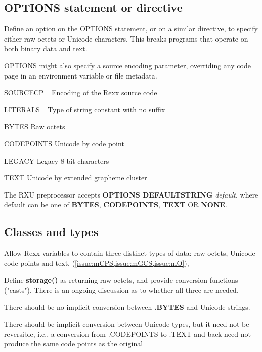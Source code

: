 \documentclass[b4paper]{article}
\begin{document}
\subsection{\textbf{OPTIONS} statement or directive}

Define an option on the OPTIONS statement, or on a similar directive,
to specify either raw octets or Unicode characters.
This breaks programs that operate on both binary data and text.

OPTIONS might also specify a source encoding parameter, overriding any
code page in an environment variable or file metadata.

\begin{definition}
\item[SOURCECP=] Encoding of the Rexx source code
\item[LITERALS=] Type of string constant with no suffix
\begin{definition}
\item[BYTES] Raw octets
\item[CODEPOINTS] Unicode by code point
\item[LEGACY] Legacy 8-bit characters
\item[\underline{TEXT}] Unicode by extended grapheme cluster
\end{definition}
\end{definition}

The RXU preprocessor accepts \textbf{OPTIONS DEFAULTSTRING} \textit{default},
where default can be one of \textbf{ BYTES},\textbf{ CODEPOINTS}, \textbf{TEXT} OR \textbf{NONE}.

\subsection{Classes and types}

Allow Rexx variables to contain three distinct types of data: raw octets, Unicode code points and text,
(\cref{issue:mCPS,issue:mGCS,issue:mO}),

Define \textbf{storage()} as returning raw octets,
and provide conversion functions ("casts").
There is an ongoing discussion as to whether all three are needed.

There should be no implicit conversion between \textbf{.BYTES} and Unicode strings.

There should be implicit conversion between Unicode types, but it need not be reversible, i.e.,
a conversion from .CODEPOINTS to .TEXT and back need not produce the same code points as the original
\end{document}
